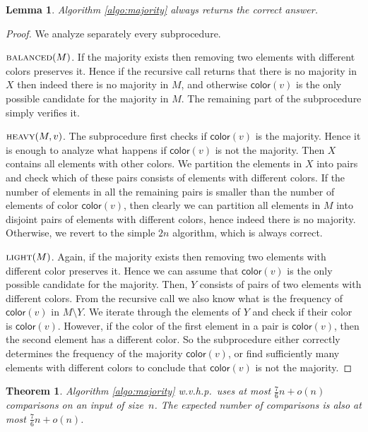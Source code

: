 \documentclass{article}[11pt,a4paper]
\newtheorem{lemma}[definition]{Lemma}
\newtheorem{theorem}[definition]{Theorem}
\newcommand{\ballcolor}{\mathsf{color}}
\begin{document}
\begin{lemma}
Algorithm \ref{algo:majority} always returns the correct answer.
\end{lemma}

\begin{proof}
We analyze separately every subprocedure.

$\textsc{balanced}(M)$.
If the majority exists then removing two elements with different colors preserves it.
Hence if the recursive call returns that there is no majority in $X$ then indeed there
is no majority in $M$, and otherwise $\ballcolor(v)$ is the only possible candidate
for the majority in $M$. The remaining part of the subprocedure simply verifies it.

$\textsc{heavy}(M,v)$.
The subprocedure first checks if $\ballcolor(v)$ is the majority. Hence it is enough to
analyze what happens if $\ballcolor(v)$ is not the majority. Then $X$ contains all elements
with other colors. We partition the elements in $X$ into pairs and check which of these pairs
consists of elements with different colors. If the number of elements in all the remaining
pairs is smaller than the number of elements of color $\ballcolor(v)$, then clearly we
can partition all elements in $M$ into disjoint pairs of elements with different colors, hence
indeed there is no majority. Otherwise, we revert to the simple $2n$ algorithm,
which is always correct.

$\textsc{light}(M)$.
Again, if the majority exists then removing two elements with different color preserves it.
Hence we can assume that $\ballcolor(v)$ is the only possible candidate for the
majority. Then, $Y$ consists of pairs of two elements with different
colors. From the recursive call we also know what is the frequency of $\ballcolor(v)$
in $M\setminus Y$. We iterate through the elements of $Y$ and check if their color
is $\ballcolor(v)$. However, if the color of the first element in a pair is $\ballcolor(v)$,
then the second element has a different color. So the subprocedure either correctly
determines the frequency of the majority $\ballcolor(v)$, or find sufficiently many elements
with different colors to conclude that $\ballcolor(v)$ is not the majority.
\end{proof}


\begin{theorem}
\label{lem:upperbound}
Algorithm \ref{algo:majority} w.v.h.p.\ uses at most $\frac{7}{6}n + o(n)$ comparisons on
an input of size~$n$. The expected number of comparisons is also at most $\frac{7}{6}n+o(n)$.
\end{theorem}
\end{document}
